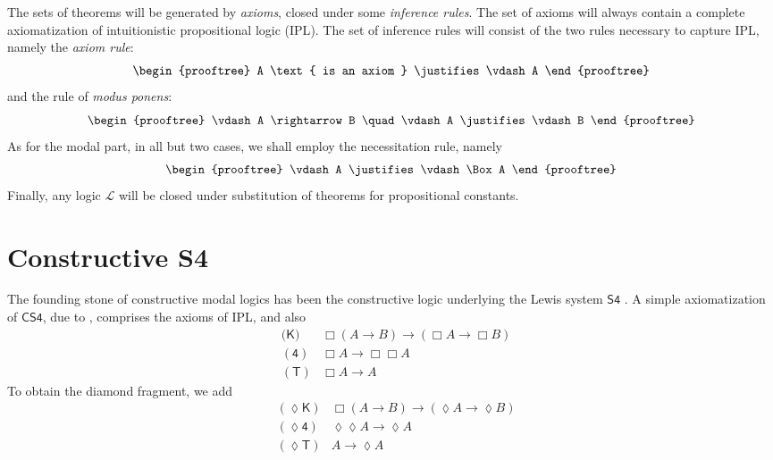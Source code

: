 \documentclass[a4paper]{amsart}
\begin{document}
The sets of theorems will be generated by \emph{axioms}, closed
under some \emph{inference rules}. The set of axioms will always
contain a complete axiomatization of intuitionistic propositional
logic (\textsf{IPL}). The set of inference rules will consist of
the two rules necessary to capture \textsf{IPL}, namely the
\emph{axiom rule}: \[ \begin{prooftree}
  A \text{ is an axiom }
    \justifies
  \vdash A
\end{prooftree} \] and the rule of \emph{modus ponens}: \[ \begin{prooftree}
  \vdash A \rightarrow B \quad \vdash A
    \justifies
  \vdash B
\end{prooftree} \] As for the modal part, in all but two cases, we
shall employ the necessitation rule, namely \[ \begin{prooftree}
  \vdash A
    \justifies
  \vdash \Box A
\end{prooftree} \] Finally, any logic $\mathcal{L}$ will be closed
under substitution of theorems for propositional constants.

\section{Constructive S4}
  \label{sec:cs4}

The founding stone of constructive modal logics has been the
constructive logic underlying the Lewis system $\mathsf{S4}$
\citep{Lewis1932}. A simple axiomatization of $\mathsf{CS4}$, due
to \cite{Alechina2001}, comprises the axioms of \textsf{IPL}, and
also \begin{align*}
  &(\mathsf{K)} & \Box (A \rightarrow B) \rightarrow (\Box A
  \rightarrow \Box B) \\
  &(\mathsf{4}) & \Box A \rightarrow \Box\Box A \\
  &(\mathsf{T}) & \Box A \rightarrow A
\end{align*} To obtain the diamond fragment, we add \begin{align*}
  &(\lozenge\mathsf{K}) & \Box(A \rightarrow B) \rightarrow
    (\lozenge A \rightarrow \lozenge B) \\
  &(\lozenge\mathsf{4}) & \lozenge\lozenge A \rightarrow \lozenge A \\
  &(\lozenge\mathsf{T}) & A \rightarrow \lozenge A
\end{align*}
\end{document}
